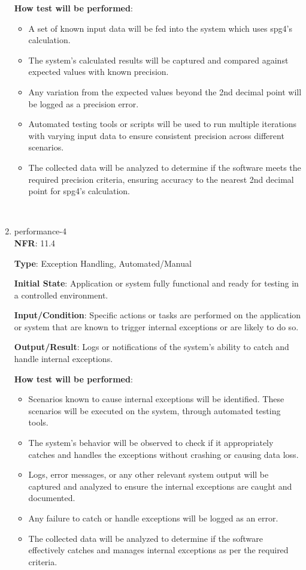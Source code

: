 \documentclass[12pt, titlepage]{article}
\begin{document}
\begin{enumerate}
\textbf{How test will be performed}: 
\begin{itemize}[noitemsep]
    \item A set of known input data will be fed into the system which uses spg4's calculation.
    \item The system's calculated results will be captured and compared against expected values with known precision.
    \item Any variation from the expected values beyond the 2nd decimal point will be logged as a precision error.
    \item Automated testing tools or scripts will be used to run multiple iterations with varying input data to ensure consistent precision across different scenarios.
    \item The collected data will be analyzed to determine if the software meets the required precision criteria, ensuring accuracy to the nearest 2nd decimal point for spg4's calculation.
\end{itemize}\\

\item{performance-4 \\}
\textbf{NFR}: 11.4

\textbf{Type}: Exception Handling, Automated/Manual

\textbf{Initial State}: Application or system fully functional and ready for testing in a controlled environment.

\textbf{Input/Condition}: Specific actions or tasks are performed on the application or system that are known to trigger internal exceptions or are likely to do so.

\textbf{Output/Result}: Logs or notifications of the system's ability to catch and handle internal exceptions.

\textbf{How test will be performed}: 
\begin{itemize}[noitemsep]
    \item Scenarios known to cause internal exceptions will be identified. These scenarios will be executed on the system, through automated testing tools.
    \item The system's behavior will be observed to check if it appropriately catches and handles the exceptions without crashing or causing data loss.
    \item Logs, error messages, or any other relevant system output will be captured and analyzed to ensure the internal exceptions are caught and documented.
    \item Any failure to catch or handle exceptions will be logged as an error.
    \item The collected data will be analyzed to determine if the software effectively catches and manages internal exceptions as per the required criteria.
\end{itemize}\\


\end{enumerate}
\end{document}
